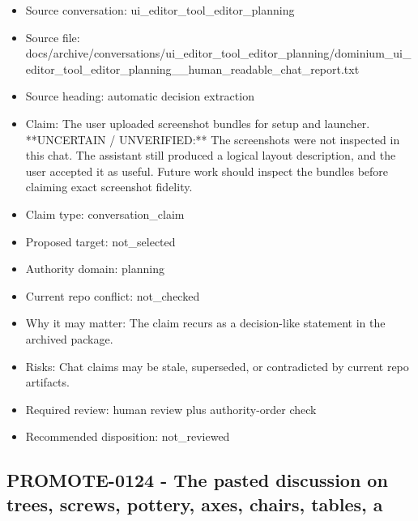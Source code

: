 \documentclass[11pt,a4paper]{report}
\begin{document}
\begin{itemize}
\item Source conversation: ui\_editor\_tool\_editor\_planning
\item Source file: docs/archive/conversations/ui\_editor\_tool\_editor\_planning/dominium\_ui\_editor\_tool\_editor\_planning\_\_human\_readable\_chat\_report.txt
\item Source heading: automatic decision extraction
\item Claim: The user uploaded screenshot bundles for setup and launcher. **UNCERTAIN / UNVERIFIED:** The screenshots were not inspected in this chat. The assistant still produced a logical layout description, and the user accepted it as useful. Future work should inspect the bundles before claiming exact screenshot fidelity.
\item Claim type: conversation\_claim
\item Proposed target: not\_selected
\item Authority domain: planning
\item Current repo conflict: not\_checked
\item Why it may matter: The claim recurs as a decision-like statement in the archived package.
\item Risks: Chat claims may be stale, superseded, or contradicted by current repo artifacts.
\item Required review: human review plus authority-order check
\item Recommended disposition: not\_reviewed
\end{itemize}

\subsection{PROMOTE-0124 - The pasted discussion on trees, screws, pottery, axes, chairs, tables, a}
\end{document}
